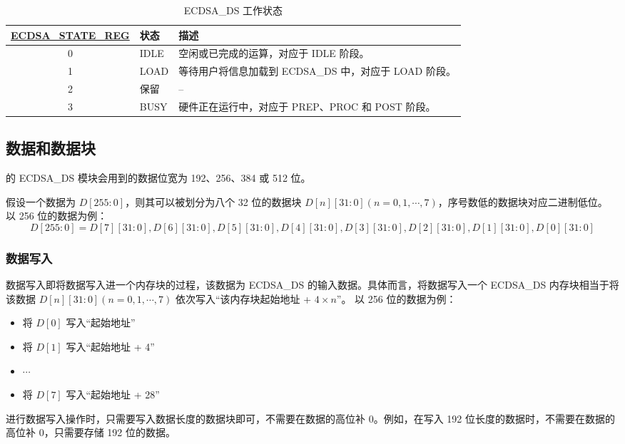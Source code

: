 \documentclass[main\_\_CN.tex]{subfiles}
\begin{document}
\begin{table}[H]
    \centering
    \caption{ECDSA\_DS 工作状态}
    \label{tab:ecdsa-working-state}
    \begin{tabular}{ | c | l | L{8cm} | }
    \hline
        \textbf{\hyperref[regdesc:ECDSASTATEREG]{ECDSA\_STATE\_REG}} & \textbf{状态} &  \textbf{描述} \\     & IDLE      &   空闲或已完成的运算，对应于 IDLE 阶段。\\     & LOAD      &   等待用户将信息加载到 ECDSA\_DS 中，对应于 LOAD 阶段。    \\     & 保留      &   --    \\     & BUSY      &   硬件正在运行中，对应于 PREP、PROC 和 POST 阶段。    \\ \hline
    \end{tabular}
\end{table}

\subsection{数据和数据块}

\chipname{} 的 ECDSA\_DS 模块会用到的数据位宽为 192、256、384 或 512 位。

假设一个数据为 $D[255:0]$，则其可以被划分为八个 32 位的数据块 $D[n][31:0](n=0,1,\cdots,7)$，序号数低的数据块对应二进制低位。
以 256 位的数据为例：
\[
D[255:0] = {D[7][31:0],D[6][31:0],D[5][31:0],
D[4][31:0],D[3][31:0],D[2][31:0],D[1][31:0],D[0][31:0]}
\]

\subsubsection{数据写入}

数据写入即将数据写入进一个内存块的过程，该数据为 ECDSA\_DS 的输入数据。具体而言，将数据写入一个 ECDSA\_DS 内存块相当于将该数据 $D[n][31:0] (n=0, 1, \cdots, 7)$ 依次写入“该内存块起始地址 + $4 \times n$”。
以 256 位的数据为例：
\begin{itemize}
    \item 将 $D[0]$ 写入“起始地址”
    \item 将 $D[1]$ 写入“起始地址 + 4”
    \item $\cdots$
    \item 将 $D[7]$ 写入“起始地址 + 28”
\end{itemize}

\begin{tiplisting}
进行数据写入操作时，只需要写入数据长度的数据块即可，不需要在数据的高位补 0。例如，在写入 192 位长度的数据时，不需要在数据的高位补 0，只需要存储 192 位的数据。
\end{tiplisting}
\end{document}
